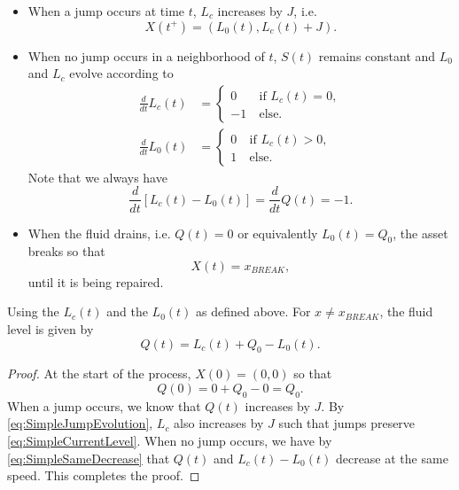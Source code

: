 \begin{itemize}
	\item When a jump occurs at time $t$, $L_c$ increases by $J$, i.e.
	\begin{equation}\label{eq:SimpleJumpEvolution}
	X(t^+)=(L_0(t),L_c(t)+J).
	\end{equation}
	\item When no jump occurs in a neighborhood of $t$, $S(t)$ remains constant and $L_0$ and $L_c$ evolve according to
		\begin{equation}\label{eq:SimpleAgeEvolution}
		\begin{split}
		\frac{d}{dt}L_c(t)&=\begin{cases}
		0&\ \text{if }L_c(t)=0,\\
		-1&\ \text{else.}
		\end{cases}\\
		\frac{d}{dt}L_0(t)&=\begin{cases}
		0&\ \text{if }L_c(t)>0,\\
		1&\ \text{else.}
		\end{cases}
		\end{split}
		\end{equation}
		Note that we always have
		\begin{equation}\label{eq:SimpleSameDecrease}
		\frac{d}{dt}\left[L_c(t)-L_0(t)\right]=\frac{d}{dt}Q(t)=-1.
		\end{equation}
	\item When the fluid drains, i.e. $Q(t)=0$ or equivalently $L_0(t)=Q_0$, the asset breaks so that
	\[
	X(t)=x_{BREAK},
	\]
	until it is being repaired.
\end{itemize}
\begin{theorem}\label{theorem:SimpleCurrentLevel}
	Using the $L_c(t)$ and the $L_0(t)$ as defined above.
	For $x\neq x_{BREAK}$, the fluid level is given by
	\begin{equation}\label{eq:SimpleCurrentLevel}
	Q(t)=L_c(t)+Q_0-L_0(t).
	\end{equation}
	\begin{proof}
		At the start of the process, $X(0)=(0,0)$ so that
		\[
		Q(0)=0+Q_0-0=Q_0.
		\]
		When a jump occurs, we know that $Q(t)$ increases by $J$.
		By \eqref{eq:SimpleJumpEvolution}, $L_c$ also increases by $J$ such that jumps preserve \eqref{eq:SimpleCurrentLevel}.
		When no jump occurs, we have by \eqref{eq:SimpleSameDecrease} that $Q(t)$ and $L_c(t)-L_0(t)$ decrease at the same speed.
		This completes the proof.
	\end{proof}
\end{theorem}

